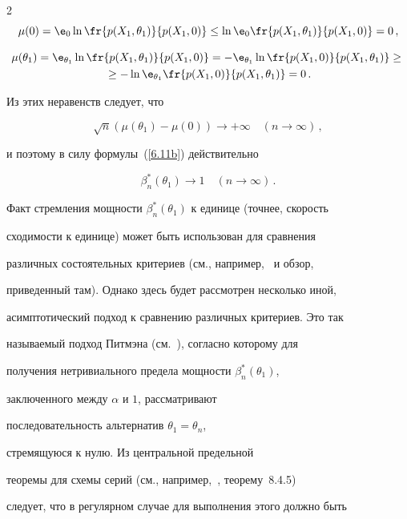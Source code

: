 \begin{multicols}{2}
$$


\mu(0) ={\e}_0\ln\fr{p(X_1,\theta_1)}{p(X_1,0)}\le\ln


{\e}_0\fr{p(X_1,\theta_1)}{p(X_1,0)} = 0\,,


$$


\begin{multline*}


\mu(\theta_1)={\e}_{\theta_1}\ln\fr{p(X_1,\theta_1)}{p(X_1,0)}


= -{\e}_{\theta_1}\ln\fr{p(X_1,0)}{p(X_1,\theta_1)}\ge{}\\


{}\ge


-\ln {\e}_{\theta_1}\fr{p(X_1,0)}{p(X_1,\theta_1)} = 0\,.


\end{multline*}


Из этих неравенств следует, что


$$


\sqrt{n}(\mu(\theta_1)-\mu(0))\to +\infty\quad (n\to\infty)\,,


$$


и поэтому в силу формулы~(\ref{6.11b}) действительно


$$


\beta_n^*(\theta_1) \to 1\quad  (n \to \infty)\,.


$$


Факт стремления мощности $\beta_n^*(\theta_1)$ к единице (точнее, скорость


сходимости к единице) может быть использован для сравнения


различных состоятельных критериев (см., например,~\cite{16be} и обзор,


приведенный там). Однако здесь будет рассмотрен несколько иной,


асимптотический подход к сравнению различных критериев. Это так


называемый подход Питмэна (см.~\cite{50be}), согласно которому для


получения нетривиального предела мощности $\beta_n^*(\theta_1)$,


заключенного между $\alpha$ и $1$, рассматривают


последовательность альтернатив $\theta_1 = \theta_n$,


стремящуюся к нулю. Из центральной предельной


тео\-ре\-мы для схемы серий (см., например,~\cite{4be}, тео\-ре\-му~8.4.5)


следует, что в регулярном случае для выполнения этого должно быть



\end{multicols}
